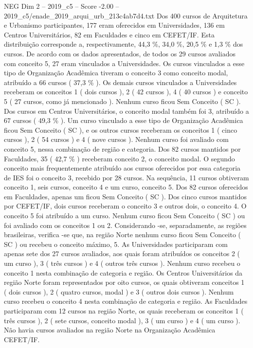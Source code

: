 \begin{textsample}{NEG Dim 2 – 2019\_c5 – Score -2.00 – 2019\_c5/enade\_2019\_arqui\_urb\_213c4ab7d4.txt}
Dos 400 cursos de Arquitetura e Urbanismo participantes, 177 eram oferecidos em Universidades, 136 em Centros Universitários, 82 em Faculdades e cinco em CEFET/IF.
Esta distribuição corresponde a, respectivamente, 44,3 \%, 34,0 \%, 20,5 \% e 1,3 \% dos cursos.
De acordo com os dados apresentados, de todos os 29 cursos avaliados com conceito 5, 27 eram vinculados a Universidades.
Os cursos vinculados a esse tipo de Organização Acadêmica tiveram o conceito 3 como conceito modal, atribuído a 66 cursos ( 37,3 \% ).
Os demais cursos vinculados a Universidades receberam os conceitos 1 ( dois cursos ), 2 ( 42 cursos ), 4 ( 40 cursos ) e conceito 5 ( 27 cursos, como já mencionado ).
Nenhum curso ficou Sem Conceito ( SC ).
Dos cursos em Centros Universitários, o conceito modal também foi 3, atribuído a 67 cursos ( 49,3 \% ).
Um curso vinculado a esse tipo de Organização Acadêmica ficou Sem Conceito ( SC ), e os outros cursos receberam os conceitos 1 ( cinco cursos ), 2 ( 54 cursos ) e 4 ( nove cursos ).
Nenhum curso foi avaliado com conceito 5, nessa combinação de região e categoria.
Dos 82 cursos mantidos por Faculdades, 35 ( 42,7 \% ) receberam conceito 2, o conceito modal.
O segundo conceito mais frequentemente atribuído aos cursos oferecidos por essa categoria de IES foi o conceito 3, recebido por 28 cursos.
Na sequência, 11 cursos obtiveram conceito 1, seis cursos, conceito 4 e um curso, conceito 5.
Dos 82 cursos oferecidos em Faculdades, apenas um ficou Sem Conceito ( SC ).
Dos cinco cursos mantidos por CEFET/IF, dois cursos receberam o conceito 3 e outros dois, o conceito 4.
O conceito 5 foi atribuído a um curso.
Nenhum curso ficou Sem Conceito ( SC ) ou foi avaliado com os conceitos 1 ou 2.
Considerando -se, separadamente, as regiões brasileiras, verifica -se que, na região Norte nenhum curso ficou Sem Conceito ( SC ) ou recebeu o conceito máximo, 5.
As Universidades participaram com apenas sete dos 27 cursos avaliados, aos quais foram atribuídos os conceitos 2 ( um curso ), 3 ( três cursos ) e 4 ( outros três cursos ).
Nenhum curso recebeu o conceito 1 nesta combinação de categoria e região.
Os Centros Universitários da região Norte foram representados por oito cursos, os quais obtiveram conceitos 1 ( dois cursos ), 2 ( quatro cursos, modal ) e 3 ( outros dois cursos ).
Nenhum curso recebeu o conceito 4 nesta combinação de categoria e região.
As Faculdades participaram com 12 cursos na região Norte, os quais receberam os conceitos 1 ( três cursos ), 2 ( sete cursos, conceito modal ), 3 ( um curso ) e 4 ( um curso ).
Não havia cursos avaliados na região Norte na Organização Acadêmica CEFET/IF.

\end{textsample}
